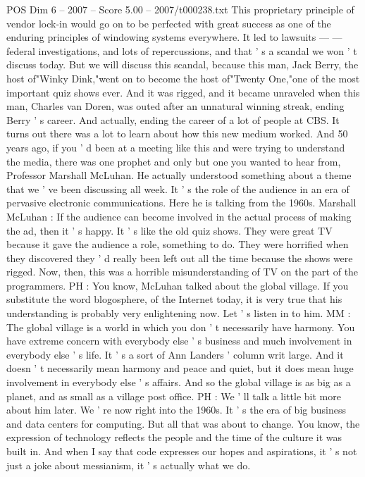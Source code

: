 \begin{textsample}{POS Dim 6 – 2007 – Score 5.00 – 2007/t000238.txt}
This proprietary principle of vendor lock-in would go on to be perfected with great success as one of the enduring principles of windowing systems everywhere.
It led to lawsuits — — federal investigations, and lots of repercussions, and that ' s a scandal we won ' t discuss today.
But we will discuss this scandal, because this man, Jack Berry, the host of"Winky Dink,"went on to become the host of"Twenty One,"one of the most important quiz shows ever.
And it was rigged, and it became unraveled when this man, Charles van Doren, was outed after an unnatural winning streak, ending Berry ' s career.
And actually, ending the career of a lot of people at CBS.
It turns out there was a lot to learn about how this new medium worked.
And 50 years ago, if you ' d been at a meeting like this and were trying to understand the media, there was one prophet and only but one you wanted to hear from, Professor Marshall McLuhan.
He actually understood something about a theme that we ' ve been discussing all week.
It ' s the role of the audience in an era of pervasive electronic communications.
Here he is talking from the 1960s.
Marshall McLuhan : If the audience can become involved in the actual process of making the ad, then it ' s happy.
It ' s like the old quiz shows.
They were great TV because it gave the audience a role, something to do.
They were horrified when they discovered they ' d really been left out all the time because the shows were rigged.
Now, then, this was a horrible misunderstanding of TV on the part of the programmers.
PH : You know, McLuhan talked about the global village.
If you substitute the word blogosphere, of the Internet today, it is very true that his understanding is probably very enlightening now.
Let ' s listen in to him.
MM : The global village is a world in which you don ' t necessarily have harmony.
You have extreme concern with everybody else ' s business and much involvement in everybody else ' s life.
It ' s a sort of Ann Landers ' column writ large.
And it doesn ' t necessarily mean harmony and peace and quiet, but it does mean huge involvement in everybody else ' s affairs.
And so the global village is as big as a planet, and as small as a village post office.
PH : We ' ll talk a little bit more about him later.
We ' re now right into the 1960s.
It ' s the era of big business and data centers for computing.
But all that was about to change.
You know, the expression of technology reflects the people and the time of the culture it was built in.
And when I say that code expresses our hopes and aspirations, it ' s not just a joke about messianism, it ' s actually what we do.

\end{textsample}
